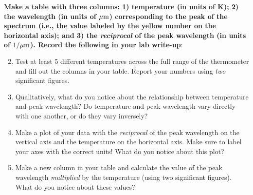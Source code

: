 \documentclass[11pt]{article}
\begin{document}
\bigskip
\textbf{Make a table with three columns: 1) temperature (in units of K); 2) the wavelength (in units of $\rm \mu m$) corresponding to the peak of the spectrum (i.e., the value labeled by the yellow number on the horizontal axis); and 3) the \emph{reciprocal} of the peak wavelength (in units of $\rm 1/\mu m$). Record the following in your lab write-up}: 
\begin{enumerate}
    \setcounter{enumi}{1}
    
    \item Test at least 5 different temperatures across the full range of the thermometer and fill out the columns in your table. Report your numbers using \emph{two} significant figures.
    \item Qualitatively, what do you notice about the relationship between temperature and peak wavelength? Do temperature and peak wavelength vary directly with one another, or do they vary inversely?
    \item Make a plot of your data with the \emph{reciprocal} of the peak wavelength on the vertical axis and the temperature on the horizontal axis. Make sure to label your axes with the correct units! What do you notice about this plot? 
    \item Make a new column in your table and calculate the value of the peak wavelength \emph{multiplied} by the temperature (using two significant figures). What do you notice about these values? 
\end{enumerate}
\end{document}
